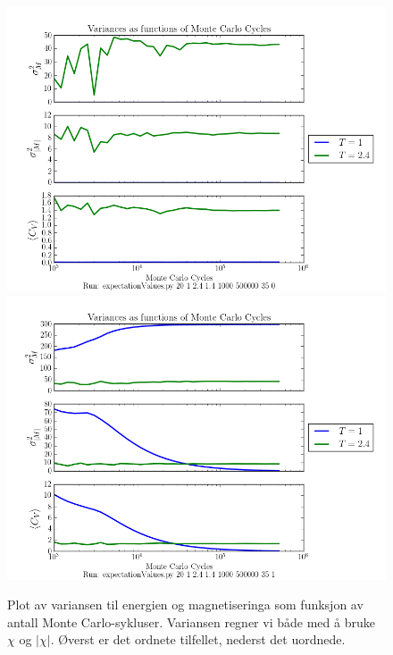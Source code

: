 \documentclass[11pt]{article}
\begin{document}
\begin{figure}[ht]
  \centering
  \includegraphics[scale=0.7]{../fig/variances.png}
  \includegraphics[scale=0.7]{../fig/variances_random.png}
  \caption{\label{fig:varianser} Plot av variansen til energien og magnetiseringa som
funksjon av antall Monte Carlo-sykluser. Variansen regner vi både med å bruke $\chi$ og $|\chi|$. Øverst
er det ordnete tilfellet, nederst det uordnede.}
\end{figure}
\end{document}
